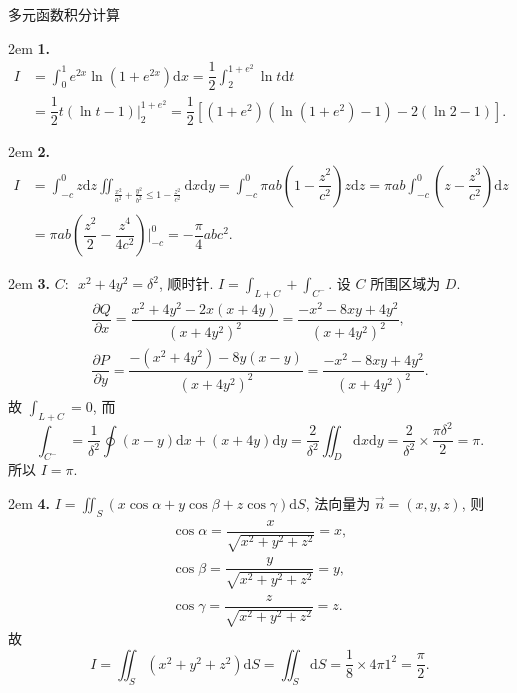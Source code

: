 \documentclass[UTF8,14pt,normal]{ctexart}
\begin{document}
\clearpage

 多元函数积分计算

    \hangindent 2em
    \noindent
    \textbf{1.} 
    \begin{align*}
        I & = \int_0^1 e^{2x} \ln (1 + e^{2x}) \mathrm{d}x = \dfrac{1}{2} \int_2^{1+e^2} \ln t \mathrm{d}t \\ & = \dfrac{1}{2} t(\ln t - 1) \bigg|_2^{1+e^2} = \dfrac{1}{2} [(1+e^2)(\ln(1+e^2) - 1) - 2(\ln 2 - 1)].
    \end{align*} 

    \hangindent 2em
    \noindent
    \textbf{2.}
    \begin{align*}
        I & = \int_{-c}^0 z \mathrm{d} z \iint_{\frac{x^2}{a^2} + \frac{y^2}{b^2} \leqslant 1 - \frac{z^2}{c^2}} \mathrm{d} x \mathrm{d} y = \int_{-c}^0 \pi ab (1 - \dfrac{z^2}{c^2})z \mathrm{d} z = \pi ab \int_{-c}^0 (z - \dfrac{z^3}{c^2}) \mathrm{d} z \\ & = \pi ab (\dfrac{z^2}{2} - \dfrac{z^4}{4c^2}) \bigg|_{-c}^0 = -\dfrac{\pi}{4} ab c^2.
    \end{align*}

    \hangindent 2em
    \noindent
    \textbf{3.} \(C: \enspace x^2 + 4y^2 = \delta^2\), 顺时针. \(I = \int_{L + C} + \int_{C^-} \). 设 \(C\) 所围区域为 \(D\).
    \begin{gather*}
        \dfrac{\partial Q}{\partial x} = \dfrac{x^2 + 4y^2 -2x(x + 4y)}{(x + 4y^2)^2} = \dfrac{-x^2 - 8xy + 4y^2}{(x + 4y^2)^2}, \\
        \dfrac{\partial P}{\partial y} = \dfrac{-(x^2 + 4y^2) - 8y(x - y)}{(x + 4y^2)^2} = \dfrac{-x^2 - 8xy + 4y^2}{(x + 4y^2)^2}.
    \end{gather*}
    故 \(\int_{L + C} = 0\), 而 \[
        \int_{C^-} = \frac{1}{\delta^2} \oint (x - y)\mathrm{d}x + (x + 4y)\mathrm{d}y = \frac{2}{\delta^2} \iint_D \mathrm{d} x \mathrm{d} y = \frac{2}{\delta^2} \times \frac{\pi \delta^2}{2} = \pi.
        \] 
    所以 \(I = \pi\).

    \hangindent 2em
    \noindent
    \textbf{4.} \(I = \iint_S (x \cos \alpha + y \cos \beta + z \cos \gamma) \mathrm{d} S\), 法向量为 \(\vec{n} = (x, y, z)\), 则 
    \begin{gather*}
        \cos \alpha = \dfrac{x}{\sqrt{x^2 + y^2 + z^2}} = x, \\ \cos \beta = \dfrac{y}{\sqrt{x^2 + y^2 + z^2}} = y, \\ \cos \gamma = \dfrac{z}{\sqrt{x^2 + y^2 + z^2}} = z.
    \end{gather*}
    故
    \[
        I = \iint_S (x^2 + y^2 + z^2) \mathrm{d} S = \iint_S \mathrm{d} S = \dfrac{1}{8} \times 4\pi 1^2 = \dfrac{\pi}{2}.
    \]
\end{document}
